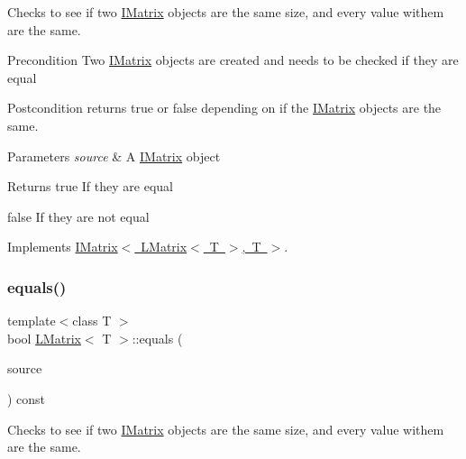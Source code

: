 Checks to see if two \mbox{\hyperlink{class_i_matrix}{I\+Matrix}} objects are the same size, and every value withem are the same. 

\begin{DoxyPrecond}{Precondition}
Two \mbox{\hyperlink{class_i_matrix}{I\+Matrix}} objects are created and needs to be checked if they are equal 
\end{DoxyPrecond}
\begin{DoxyPostcond}{Postcondition}
returns true or false depending on if the \mbox{\hyperlink{class_i_matrix}{I\+Matrix}} objects are the same.
\end{DoxyPostcond}

\begin{DoxyParams}{Parameters}
{\em source} & A \mbox{\hyperlink{class_i_matrix}{I\+Matrix}} object \\
\hline
\end{DoxyParams}
\begin{DoxyReturn}{Returns}
true If they are equal 

false If they are not equal 
\end{DoxyReturn}


Implements \mbox{\hyperlink{class_i_matrix_afa03122ed7ddb531656ce27690f8fb03}{I\+Matrix$<$ L\+Matrix$<$ T $>$, T $>$}}.

\mbox{\label{class_l_matrix_ac869ef2359c1330f01f0af7774651efc}} 
\subsubsection{\texorpdfstring{equals()}{equals()}\hspace{0.1cm}{\footnotesize\ttfamily [4/6]}}
{\footnotesize\ttfamily template$<$class T $>$ \\
bool \mbox{\hyperlink{class_l_matrix}{L\+Matrix}}$<$ T $>$\+::equals (\begin{DoxyParamCaption}\item[{const \mbox{\hyperlink{class_i_matrix}{I\+Matrix}}$<$ \mbox{\hyperlink{class_u_matrix}{U\+Matrix}}$<$ T $>$, T $>$ \&}]{source }\end{DoxyParamCaption}) const}



Checks to see if two \mbox{\hyperlink{class_i_matrix}{I\+Matrix}} objects are the same size, and every value withem are the same. 

